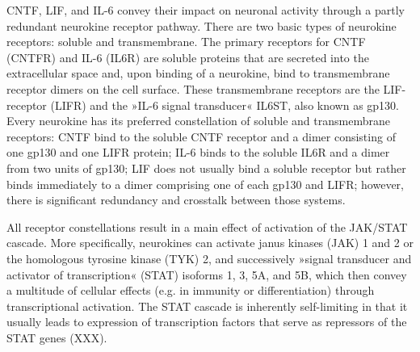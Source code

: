 CNTF, LIF, and IL-6 convey their impact on neuronal activity through a partly redundant neurokine receptor pathway. There are two basic types of neurokine receptors: soluble and transmembrane. The primary receptors for CNTF (CNTFR) and IL-6 (IL6R) are soluble proteins that are secreted into the extracellular space and, upon binding of a neurokine, bind to transmembrane receptor dimers on the cell surface. These transmembrane receptors are the LIF-receptor (LIFR) and the »IL-6 signal transducer« IL6ST, also known as gp130. Every neurokine has its preferred constellation of soluble and transmembrane receptors: CNTF bind to the soluble CNTF receptor and a dimer consisting of one gp130 and one LIFR protein; IL-6 binds to the soluble IL6R and a dimer from two units of gp130; LIF does not usually bind a soluble receptor but rather binds immediately to a dimer comprising one of each gp130 and LIFR; however, there is significant redundancy and crosstalk between those systems\cite{Rawlings2004,Nathanson2012}.

All receptor constellations result in a main effect of activation of the JAK/STAT cascade. More specifically, neurokines can activate janus kinases (JAK) 1 and 2 or the homologous tyrosine kinase (TYK) 2, and successively »signal transducer and activator of transcription« (STAT) isoforms 1, 3, 5A, and 5B, which then convey a multitude of cellular effects (e.g. in immunity or differentiation) through transcriptional activation. The STAT cascade is inherently self-limiting in that it usually leads to expression of transcription factors that serve as repressors of the STAT genes (XXX).





